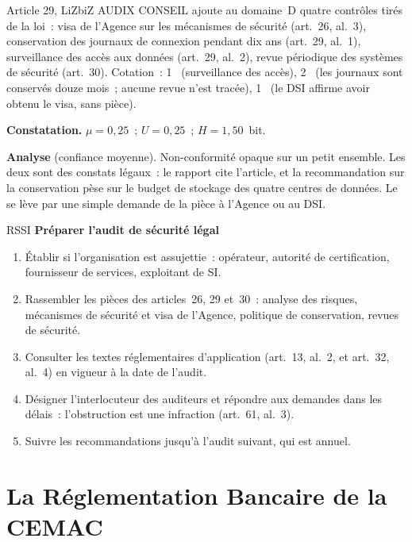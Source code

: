 \begin{boxlecture}{Article 29, LiZbiZ}
AUDIX CONSEIL ajoute au domaine~D quatre contrôles tirés de la loi~: visa de
l'Agence sur les mécanismes de sécurité (art.~26, al.~3), conservation des
journaux de connexion pendant dix ans (art.~29, al.~1), surveillance des
accès aux données (art.~29, al.~2), revue périodique des systèmes de
sécurité (art.~30). Cotation~: 1~\OUI{} (surveillance des accès), 2~\NON{}
(les journaux sont conservés douze mois~; aucune revue n'est tracée),
1~\NEK{} (le DSI affirme avoir obtenu le visa, sans pièce).

\medskip
\textbf{Constatation.} $\mu = 0{,}25$~; $U = 0{,}25$~; $H = 1{,}50$~bit.

\medskip
\textbf{Analyse} (confiance moyenne). Non-conformité opaque sur un petit
ensemble. Les deux \NON{} sont des constats légaux~: le rapport cite
l'article, et la recommandation sur la conservation pèse sur le budget de
stockage des quatre centres de données. Le \NEK{} se lève par une simple
demande de la pièce à l'Agence ou au DSI.

\medskip
\hfill{}
\end{boxlecture}

\begin{boxmetier}{RSSI}
\textbf{Préparer l'audit de sécurité légal}
\begin{enumerate}
    \item Établir si l'organisation est assujettie~: opérateur, autorité de
          certification, fournisseur de services, exploitant de SI.
    \item Rassembler les pièces des articles~26, 29 et~30~: analyse des
          risques, mécanismes de sécurité et visa de l'Agence, politique de
          conservation, revues de sécurité.
    \item Consulter les textes réglementaires d'application (art.~13,
          al.~2, et art.~32, al.~4) en vigueur à la date de l'audit.
    \item Désigner l'interlocuteur des auditeurs et répondre aux demandes
          dans les délais~: l'obstruction est une infraction (art.~61,
          al.~3).
    \item Suivre les recommandations jusqu'à l'audit suivant, qui est
          annuel.
\end{enumerate}
\end{boxmetier}

\section{La Réglementation Bancaire de la CEMAC}
\label{sec:c15-cobac}

